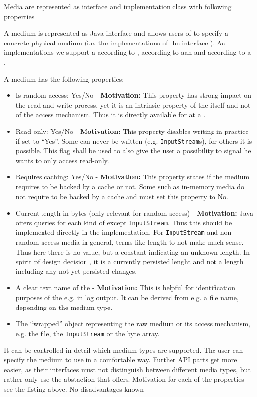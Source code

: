 {%
Media are represented as interface and implementation class with following properties
}
{%
A medium is represented as Java interface \IMedium{} and allows users of \LibName{} to specify a concrete physical medium (i.e. the implementations of the interface \IMedium{}). As implementations we support a \FileMedium{} according to , according to  aan \InputStreamMedium{} and according to  a \InMemoryMedium{}.

A medium has the following properties:
\begin{itemize}
\item Is random-access: Yes/No \-- \textbf{Motivation:} This property has strong impact on the read and write process, yet it is an intrinsic property of the \TERMmedium{} itself and not of the access mechanism. Thus it is directly available for at a \TERMmedium{}.
\item Read-only: Yes/No \-- \textbf{Motivation:} This property disables writing in practice if set to ``Yes''. Some \TERMmedia{} can never be written (e.g. \texttt{InputStream}s), for others it is possible. This flag shall be used to also give the \LibName{} user a possibility to signal he wants to only access read-only.
\item Requires caching: Yes/No \-- \textbf{Motivation:} This property states if the medium requires to be backed by a cache or not. Some \TERMmedia{} such as in-memory media do not require to be backed by a cache and must set this property to No.
\item Current length in bytes (only relevant for random-access) \-- \textbf{Motivation:} Java offers queries for each kind of \IMedium{} except \texttt{InputStream}. Thus this should be implemented directly in the \IMedium{} implementation. For \texttt{InputStream} and non-random-access media in general, terms like length to not make much sense. Thus here there is no value, but a constant indicating an unknown length. In spirit pf design decision , it is a currently persisted lenght and not a length including any not-yet persisted changes.
\item A clear text name of the \TERMmedium{} \-- \textbf{Motivation:} This is helpful for identification purposes of the \IMedium{} e.g. in log output. It can be derived from e.g. a file name, depending on the medium type.
\item The ``wrapped'' object representing the raw medium or its access mechanism, e.g. the file, the \texttt{InputStream} or the byte array.
\end{itemize}
}
{%
It can be controlled in detail which medium types are supported. The user can specify the medium to use in a comfortable way. Further API parts get more easier, as their interfaces must not distinguish between different media types, but rather only use the abstaction that \IMedium{} offers. Motivation for each of the properties see the listing above.
}
{%
No disadvantages known
}

